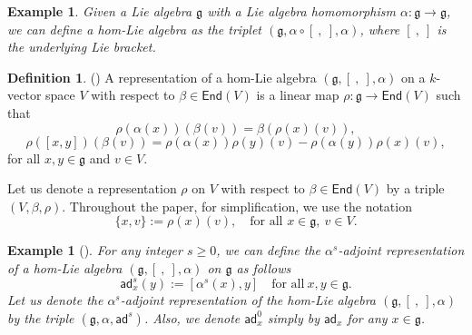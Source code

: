 \documentclass[a4paper,11pt]{amsart}
\theoremstyle{plain}
\newtheorem{example}[theorem]{Example}
\theoremstyle{definition}
\newtheorem{definition}[theorem]{Definition}
\theoremstyle{remark}
\numberwithin{equation}{section}
\begin{document}
\begin{example}
Given a Lie algebra $\mathfrak{g}$ with a Lie algebra homomorphism $\alpha:\mathfrak{g}\rightarrow \mathfrak{g}$, we can define a hom-Lie algebra as the triplet $(\mathfrak{g},\alpha\circ [~,~],\alpha)$, where $[~,~]$ is the underlying Lie bracket. 
\end{example}

\begin{definition}\label{Rep-hom-Lie}(\cite{Sheng}) A representation of a hom-Lie algebra $(\mathfrak{g},[~,~],\alpha)$ on a $k$-vector space $V$ with respect to $\beta\in\mathsf{End}(V)$ is a linear map $\rho: \mathfrak{g}\rightarrow \mathsf{End}(V)$ such that 
\begin{equation}
\rho(\alpha(x))(\beta(v))= \beta(\rho(x)(v)),
\end{equation}
\begin{equation}
\rho([x,y])(\beta(v))= \rho(\alpha(x))\rho(y)(v)-\rho(\alpha(y))\rho(x)(v),
\end{equation}
for all $x,y \in \mathfrak{g}$ and $v\in V$. 
\end{definition}
Let us denote a representation $\rho$ on $V$ with respect to $\beta\in \mathsf{End}(V)$ by a triple $(V,\beta,\rho)$. Throughout the paper, for simplification, we use the notation
$$\{x,v\}:=\rho(x)(v), \quad\mbox{for all } x\in \mathfrak{g}, ~v\in V.$$

\begin{example}[\cite{Sheng}]\label{adjoint representation}
 For any integer $s\geq 0$, we can define the $\alpha^s$-adjoint representation of a hom-Lie algebra $(\mathfrak{g},[~,~],\alpha)$ on $\mathfrak{g}$ as follows
$$\mathsf{ad}_x^s(y):=[\alpha^s(x),y]\quad\mbox{for all}~x,y\in \mathfrak{g}.$$
Let us denote the $\alpha^s$-adjoint representation of the hom-Lie algebra $(\mathfrak{g},[~,~],\alpha)$ by the triple $(\mathfrak{g},\alpha,\mathsf{ad}^s)$. Also, we denote $\mathsf{ad}_x^0$ simply by $\mathsf{ad}_x$ for any $x\in\mathfrak{g}$.
\end{example}
\end{document}
